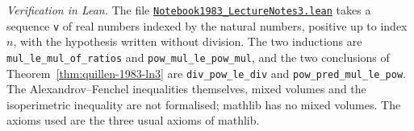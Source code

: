 \emph{Verification in Lean.} The file \href{\leanblobmain/Notebook1983_LectureNotes3.lean}{\texttt{Notebook1983\_\allowbreak{}LectureNotes3.\allowbreak{}lean}} takes a sequence \texttt{v} of real numbers indexed by the natural numbers, positive up to index $n$, with the hypothesis written without division. The two inductions are \texttt{mul\_le\_mul\_of\_ratios} and \texttt{pow\_mul\_le\_pow\_mul}, and the two conclusions of Theorem~\ref{thm:quillen-1983-ln3} are \texttt{div\_pow\_le\_div} and \texttt{pow\_pred\_mul\_le\_pow}. The Alexandrov--Fenchel inequalities themselves, mixed volumes and the isoperimetric inequality are not formalised; mathlib has no mixed volumes. The axioms used are the three usual axioms of mathlib.

